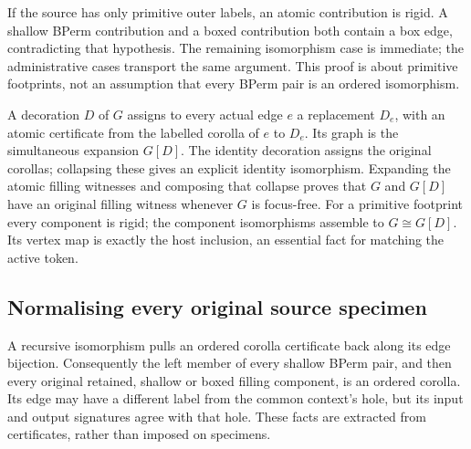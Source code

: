 
If the source has only primitive outer labels, an atomic contribution is
rigid. A shallow BPerm contribution and a boxed contribution both contain a
box edge, contradicting that hypothesis. The remaining isomorphism case is
immediate; the administrative cases transport the same argument. This proof
is about primitive footprints, not an assumption that every BPerm pair is
an ordered isomorphism.


A decoration $D$ of $G$ assigns to every actual edge $e$ a replacement
$D_e$, with an atomic certificate from the labelled corolla of $e$ to $D_e$.
Its graph is the simultaneous expansion $G[D]$. The identity decoration
assigns the original corollas; collapsing these gives an explicit identity
isomorphism. Expanding the atomic filling witnesses and composing that
collapse proves that $G$ and $G[D]$ have an original filling witness whenever
$G$ is focus-free. For a primitive footprint every component is rigid;
the component isomorphisms assemble to $G\cong G[D]$. Its vertex map is
exactly the host inclusion, an essential fact for matching the active token.


\subsection{Normalising every original source specimen}
A recursive isomorphism pulls an ordered corolla certificate back along its
edge bijection. Consequently the left member of every shallow BPerm pair,
and then every original retained, shallow or boxed filling component,
is an ordered corolla. Its edge may have a different label from the common
context's hole, but its input and output signatures agree with that hole.
These facts are extracted from certificates, rather than imposed on specimens.

